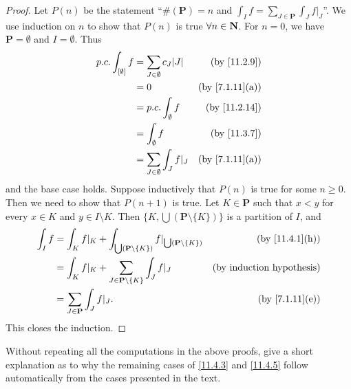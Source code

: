 \begin{proof}
  Let \(P(n)\) be the statement ``\(\#(\mathbf{P}) = n\) and \(\int_I f = \sum_{J \in \mathbf{P}} \int_J f|_J\)''.
  We use induction on \(n\) to show that \(P(n)\) is true \(\forall n \in \mathbf{N}\).
  For \(n = 0\), we have \(\mathbf{P} = \emptyset\) and \(I = \emptyset\).
  Thus
  \begin{align*}
    p.c. \int_{[\emptyset]} f & = \sum_{J \in \emptyset} c_J \abs{J} & \text{(by \cref{11.2.9})}    \\
                              & = 0                                  & \text{(by \cref{7.1.11}(a))} \\
                              & = p.c. \int_{\emptyset} f            & \text{(by \cref{11.2.14})}   \\
                              & = \int_{\emptyset} f                 & \text{(by \cref{11.3.7})}    \\
                              & = \sum_{J \in \emptyset} \int_J f|_J & \text{(by \cref{7.1.11}(a))}
  \end{align*}
  and the base case holds.
  Suppose inductively that \(P(n)\) is true for some \(n \geq 0\).
  Then we need to show that \(P(n + 1)\) is true.
  Let \(K \in \mathbf{P}\) such that \(x < y\) for every \(x \in K\) and \(y \in I \setminus K\).
  Then \(\big\{K, \bigcup (\mathbf{P} \setminus \{K\})\big\}\) is a partition of \(I\), and
  \begin{align*}
    \int_I f & = \int_K f|_K + \int_{\bigcup (\mathbf{P} \setminus \{K\})} f|_{\bigcup (\mathbf{P} \setminus \{K\})} & \text{(by \cref{11.4.1}(h))}     \\
             & = \int_K f|_K + \sum_{J \in \mathbf{P} \setminus \{K\}} \int_J f|_J                                   & \text{(by induction hypothesis)} \\
             & = \sum_{J \in \mathbf{P}} \int_J f|_J.                                                                & \text{(by \cref{7.1.11}(e))}
  \end{align*}
  This closes the induction.
\end{proof}

\begin{exercise}\label{ex 11.4.4}
  Without repeating all the computations in the above proofs, give a short explanation as to why the remaining cases of \cref{11.4.3} and \cref{11.4.5} follow automatically from the cases presented in the text.
\end{exercise}

